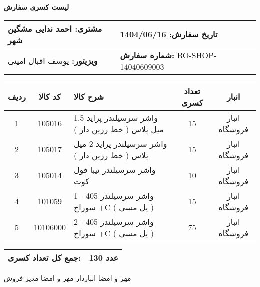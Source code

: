 \documentclass[a4paper,12pt]{article}
\begin{document}
\begin{center}
    {\Huge \textbf{   لیست کسری سفارش   }} \\
\end{center}

\vspace{0.5cm}

\noindent
\begin{tabular}{|p{7cm}|p{7cm}|}
\hline
\textbf{مشتری:} احمد ندایی مشگین شهر & \textbf{تاریخ سفارش:} 1404/06/16 \\
\hline
\textbf{ویزیتور:} یوسف اقبال امینی & \textbf{شماره سفارش:} BO-SHOP-14040609003 \\
\hline
\end{tabular}

\vspace{0.5cm}

\begin{longtable}{|c|c|p{6cm}|c|c|}
\hline
\rowcolor{headerblue} \color{white}
\textbf{ردیف} &  \textbf{کد کالا} & \textbf{شرح کالا} & \textbf{تعداد کسری} & \textbf{انبار} \\
\hline
\endhead
1 & 105016 & واشر سرسیلندر پراید 1.5 میل پلاس ( خط رزین دار ) & 15 & انبار فروشگاه \\
\hline
2 & 105017 & واشر سرسیلندر پراید 2 میل پلاس ( خط رزین دار ) & 15 & انبار فروشگاه \\
\hline
3 & 105014 & واشر سرسیلندر تیبا فول کوت & 10 & انبار فروشگاه \\
\hline
4 & 101059 & واشر سرسیلندر 405 - 1 سوراخ +C ( پل مسی ) & 15 & انبار فروشگاه \\
\hline
5 & 10106000 & واشر سرسیلندر 405 - 2 سوراخ +C ( پل مسی ) & 75 & انبار فروشگاه \\
\hline

\end{longtable}

\vspace{0.3cm}
\noindent
\begin{tabular}{|p{7cm}|p{7cm}|}
\hline
\textbf{جمع کل تعداد کسری:} & 130 عدد \\
\hline
\end{tabular}

\vspace{1.5cm}

\noindent
مهر و امضا انباردار \hspace{8cm} مهر و امضا مدیر فروش
\end{document}
